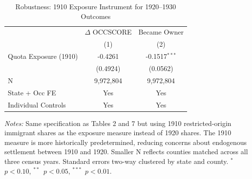 \begin{table}[htbp]
\centering
\caption{Robustness: 1910 Exposure Instrument for 1920--1930 Outcomes}
\label{tab:1910exposure}
\small
\begin{threeparttable}
\begin{tabular}[t]{lcc}
\toprule
 & $\Delta$ OCCSCORE & Became Owner \\
 & (1) & (2) \\
\midrule
Quota Exposure (1910) & -0.4261 & -0.1517$^{***}$ \\
 & (0.4924) & (0.0562) \\
\midrule
N & 9,972,804 & 9,972,804 \\
State + Occ FE & Yes & Yes \\
Individual Controls & Yes & Yes \\
\bottomrule
\end{tabular}
\begin{tablenotes}[flushleft]\footnotesize
\item \textit{Notes:} Same specification as Tables 2 and 7 but using 1910
restricted-origin immigrant shares as the exposure measure instead of 1920 shares.
The 1910 measure is more historically predetermined, reducing concerns about
endogenous settlement between 1910 and 1920. Smaller N reflects counties matched
across all three census years. Standard errors two-way clustered by state and county.
$^{*}$~$p<0.10$, $^{**}$~$p<0.05$, $^{***}$~$p<0.01$.
\end{tablenotes}
\end{threeparttable}
\end{table}
